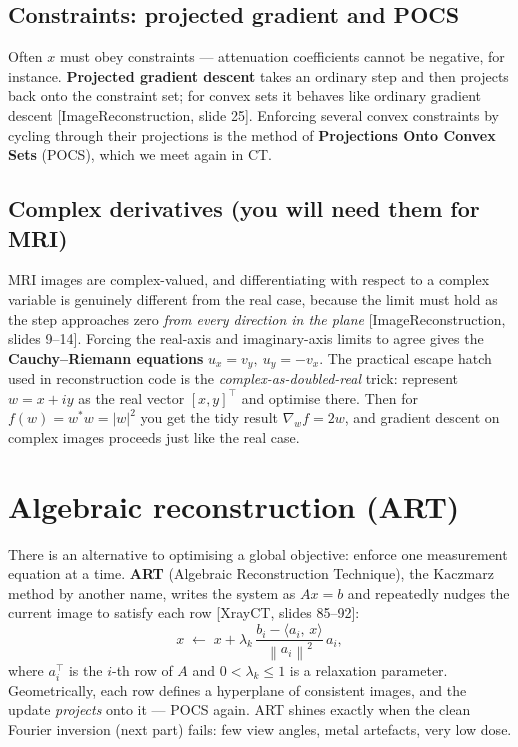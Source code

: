 \documentclass[11pt]{article}
\newcommand{\norm}[1]{\left\lVert #1 \right\rVert}
\newcommand{\abs}[1]{\left\lvert #1 \right\rvert}
\newcommand{\inner}[2]{\langle #1,\, #2 \rangle}
\newcommand{\deck}[1]{\textsf{\small[#1]}}
\begin{document}
\subsection{Constraints: projected gradient and POCS}

Often $x$ must obey constraints --- attenuation coefficients cannot be negative,
for instance. \textbf{Projected gradient descent} takes an ordinary step and
then projects back onto the constraint set; for convex sets it behaves like
ordinary gradient descent \deck{ImageReconstruction, slide 25}. Enforcing
several convex constraints by cycling through their projections is the method of
\textbf{Projections Onto Convex Sets} (POCS), which we meet again in CT.

\subsection{Complex derivatives (you will need them for MRI)}

MRI images are complex-valued, and differentiating with respect to a complex
variable is genuinely different from the real case, because the limit must hold
as the step approaches zero \emph{from every direction in the plane}
\deck{ImageReconstruction, slides 9--14}. Forcing the real-axis and
imaginary-axis limits to agree gives the \textbf{Cauchy--Riemann equations}
$u_x=v_y,\ u_y=-v_x$. The practical escape hatch used in reconstruction code is
the \emph{complex-as-doubled-real} trick: represent $w=x+iy$ as the real vector
$[x,y]^{\!\top}$ and optimise there. Then for $f(w)=w^{*}w=\abs{w}^2$ you get the
tidy result $\nabla_w f = 2w$, and gradient descent on complex images proceeds
just like the real case.

\section{Algebraic reconstruction (ART)}

There is an alternative to optimising a global objective: enforce one
measurement equation at a time. \textbf{ART} (Algebraic Reconstruction
Technique), the Kaczmarz method by another name, writes the system as
$Ax=b$ and repeatedly nudges the current image to satisfy each row
\deck{XrayCT, slides 85--92}:
\[
x \;\leftarrow\; x + \lambda_k\,\frac{b_i - \inner{a_i}{x}}{\norm{a_i}^2}\,a_i,
\]
where $a_i^{\!\top}$ is the $i$-th row of $A$ and $0<\lambda_k\le 1$ is a
relaxation parameter. Geometrically, each row defines a hyperplane of consistent
images, and the update \emph{projects} onto it --- POCS again. ART shines
exactly when the clean Fourier inversion (next part) fails: few view angles,
metal artefacts, very low dose.
\end{document}
